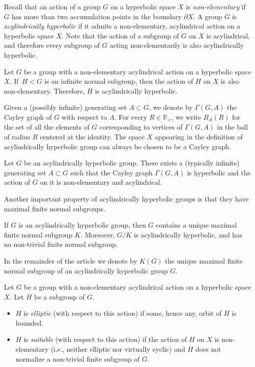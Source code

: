 Recall that an action of a group $G$ on a hyperbolic space $X$ is \emph{non-elementary} if~$G$ has more than two accumulation points in the boundary $\partial X$.
A group $G$ is \emph{acylindrically hyperbolic} if it admits a non-elementary, acylindrical action on a hyperbolic space $X$.
Note that the action of a subgroup of $G$ on $X$ is acylindrical, and therefore every subgroup of $G$ acting non-elementarily is also acylindrically hyperbolic.

\begin{lemma}
\label{lem:normal}
Let $G$ be a group with a non-elementary acylindrical action on a hyperbolic space $X$. If~$H < G$ is an infinite normal subgroup, then the action of $H$ on $X$ is also non-elementary. Therefore, $H$ is acylindrically hyperbolic.
\end{lemma}

Given a (possibly infinite) generating set $A \subset G$, we denote by $\Gamma(G,A)$ the Cayley graph of $G$ with respect to $A$.
For every $R \in \mathbb R_+$, we write $B_A(R)$ for the set of all the elements of $G$ corresponding to vertices of $\Gamma(G,A)$ in the ball of radius $R$ centered at the identity.
The space $X$ appearing in the definition of acylindrically hyperbolic group can always be chosen to be a Cayley graph.

\begin{theorem}
\label{thm:cayley}
Let $G$ be an acylindrically hyperbolic group.
There exists a (typically infinite) generating set $A \subset G$ such that the Cayley graph $\Gamma(G, A)$ is hyperbolic and the action of $G$ on it is non-elementary and acylindrical.
\end{theorem}

Another important property of acylindrically hyperbolic groups is that they have maximal finite normal subgroups.

\begin{theorem}
\label{thm:K}
If $G$ is an acylindrically hyperbolic group, then $G$ contains a unique maximal finite normal subgroup $K$.
Moreover, $G/K$ is acylindrically hyperbolic, and has no non-trivial finite normal subgroup.
\end{theorem}

In the remainder of the article we denote by $K(G)$ the unique maximal finite normal subgroup of an acylindrically hyperbolic group $G$.

\begin{definition}
Let $G$ be a group with a non-elementary acylindrical action on a hyperbolic space $X$.
Let $H$ be a subgroup of $G$.
\begin{itemize}
\item $H$ is \emph{elliptic} (with respect to this action) if some, hence any, orbit of $H$ is bounded.
\item $H$ is \emph{suitable} (with respect to this action) if the action of $H$ on $X$ is non-elementary (i.e., neither elliptic nor virtually cyclic) and $H$ does not normalize a non-trivial finite subgroup of $G$.
\end{itemize}
\end{definition}

